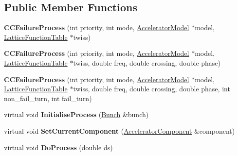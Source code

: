 \subsection*{Public Member Functions}
\begin{DoxyCompactItemize}
\item 
\mbox{\label{classParticleTracking_1_1CCFailureProcess_a171576b7a0b0e136c7041361e657c766}} 
{\bfseries C\+C\+Failure\+Process} (int priority, int mode, \hyperlink{classAcceleratorModel}{Accelerator\+Model} $\ast$model, \hyperlink{classLatticeFunctionTable}{Lattice\+Function\+Table} $\ast$twiss)
\item 
\mbox{\label{classParticleTracking_1_1CCFailureProcess_ae6436ce8a7eca4a56f2fa2e7158d0354}} 
{\bfseries C\+C\+Failure\+Process} (int priority, int mode, \hyperlink{classAcceleratorModel}{Accelerator\+Model} $\ast$model, \hyperlink{classLatticeFunctionTable}{Lattice\+Function\+Table} $\ast$twiss, double freq, double crossing, double phase)
\item 
\mbox{\label{classParticleTracking_1_1CCFailureProcess_a261a44ddfc6788d6bb662a302a4a048e}} 
{\bfseries C\+C\+Failure\+Process} (int priority, int mode, \hyperlink{classAcceleratorModel}{Accelerator\+Model} $\ast$model, \hyperlink{classLatticeFunctionTable}{Lattice\+Function\+Table} $\ast$twiss, double freq, double crossing, double phase, int non\+\_\+fail\+\_\+turn, int fail\+\_\+turn)
\item 
\mbox{\label{classParticleTracking_1_1CCFailureProcess_a06335f46c5ba7832146e63e2a3dcf654}} 
virtual void {\bfseries Initialise\+Process} (\hyperlink{classBunch}{Bunch} \&bunch)
\item 
\mbox{\label{classParticleTracking_1_1CCFailureProcess_aa44d30217e3f47d96db39466b3842739}} 
virtual void {\bfseries Set\+Current\+Component} (\hyperlink{classAcceleratorComponent}{Accelerator\+Component} \&component)
\item 
\mbox{\label{classParticleTracking_1_1CCFailureProcess_aa82ef6c532bfb74a99650dcc621eac9e}} 
virtual void {\bfseries Do\+Process} (double ds)

\end{DoxyCompactItemize}
